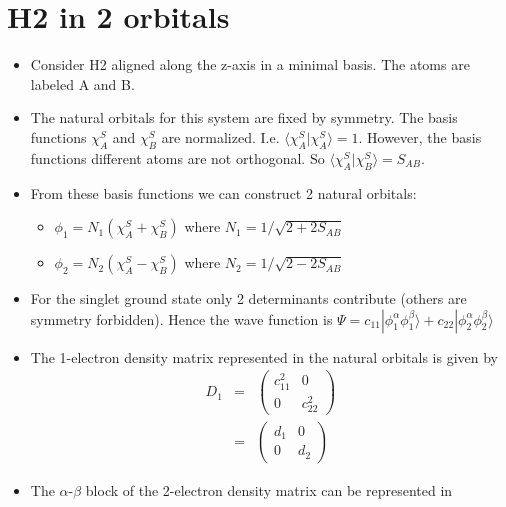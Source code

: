 \documentclass{amsart}
\begin{document}
\newlength{\classpageheight}
\setlength{\classpageheight}{\pdfpageheight}
\newlength{\classpagewidth}
\setlength{\classpagewidth}{\pdfpagewidth}

\section{H2 in 2 orbitals}

\begin{itemize}
\item Consider H2 aligned along the z-axis in a minimal basis. The atoms are labeled A and B.
\item The natural orbitals for this system are fixed by symmetry. The basis functions $\chi_A^S$ and 
        $\chi_B^S$ are normalized. I.e. $\langle \chi_A^S|\chi_A^S\rangle = 1$. However, the basis 
        functions  different atoms are not orthogonal. So $\langle \chi_A^S|\chi_B^S\rangle = S_{AB}$.
\item From these basis functions we can construct 2 natural orbitals:
         \begin{itemize}
         \item $\phi_1 = N_1 \left(\chi_A^S + \chi_B^S\right)$ where $N_1 = 1/\sqrt{2+2S_{AB}}$
         \item $\phi_2 = N_2 \left(\chi_A^S - \chi_B^S\right)$ where $N_2 = 1/\sqrt{2-2S_{AB}}$
         \end{itemize}
\item For the singlet ground state only 2 determinants contribute (others are symmetry forbidden). Hence  
        the wave function is 
        $\Psi = c_{11}|\phi_1^\alpha\phi_1^\beta\rangle + c_{22}|\phi_2^\alpha\phi_2^\beta\rangle $
\item The 1-electron density matrix represented in the natural orbitals is given by
         \begin{eqnarray}
         D_{1} &=&
         \left(\begin{matrix}
         c_{11}^2 & 0 \\
         0 & c_{22}^2
         \end{matrix}\right) \\
         &=&
         \left(\begin{matrix}
         d_{1} & 0 \\
         0 & d_{2}
         \end{matrix}\right)
         \end{eqnarray}
\item The $\alpha$-$\beta$ block of the 2-electron density matrix can be represented in

\end{itemize}
\end{document}

